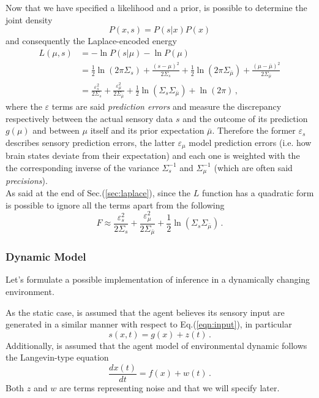 \documentclass[a4paper, 10pt]{article}
\begin{document}
Now that we have specified a likelihood and a prior, is possible to determine the joint density
\begin{equation}
P(x,s) = P(s | x) P(x)
\end{equation}
and consequently the Laplace-encoded energy
\begin{equation}
\begin{split}
L(\mu,s) & = - \ln P(s|\mu) - \ln P(\mu)  \\
		 & = \frac{1}{2} \ln (2 \pi \Sigma_{s}) + \frac{(s-\mu)^2}{2 \Sigma_{s}} + \frac{1}{2} \ln (2 \pi \Sigma_{\bar{\mu}}) + \frac{(\mu-\bar{\mu})^2}{2 \Sigma_{\bar{\mu}}} \\
		 & = \frac{\varepsilon_{s}^2}{2 \Sigma_{s}} + \frac{\varepsilon_{\mu}^2}{2 \Sigma_{\bar{\mu}}} + \frac{1}{2} \ln \left( \Sigma_{s} \Sigma_{\bar{\mu}} \right) + \ln (2 \pi) \, ,
\end{split}
\end{equation}
where the $\varepsilon$ terms are said \emph{prediction errors} and measure the discrepancy respectively between the actual sensory data $s$ and the outcome of its prediction $g(\mu)$ and between $\mu$ itself and its prior expectation $\bar{\mu}$. Therefore the former $\varepsilon_{s}$ describes sensory prediction errors, the latter $\varepsilon_{\mu}$ model prediction errors (i.e. how brain states deviate from their expectation) and each one is weighted with the the corresponding inverse of the variance $\Sigma_{s}^{-1}$ and $\Sigma_{\mu}^{-1}$ (which are often said \emph{precisions}). \\
As said at the end of Sec.(\ref{sec:laplace}), since the $L$ function has a quadratic form is possible to ignore all the terms apart from the following
\begin{equation}
F \approx \frac{\varepsilon_{s}^2}{2 \Sigma_{s}} + \frac{\varepsilon_{\mu}^2}{2 \Sigma_{\bar{\mu}}} + \frac{1}{2} \ln \left( \Sigma_{s} \Sigma_{\bar{\mu}} \right) \, .
\end{equation}


\subsubsection{Dynamic Model}
Let's formulate a possible implementation of inference in a dynamically changing environment.

As the static case, is assumed that the agent believes its sensory input are generated in a similar manner with respect to Eq.(\ref{eqn:input}), in particular
\begin{equation}
s(x,t) = g(x) + z(t) \, .
\label{eqn:s}
\end{equation}
Additionally, is assumed that the agent model of environmental dynamic follows the Langevin-type equation
\begin{equation}
\frac{d x(t)}{dt} = f(x) + w(t) \, .
\label{eqn:x}
\end{equation}
Both $z$ and $w$ are terms representing noise and that we will specify later.
\end{document}
